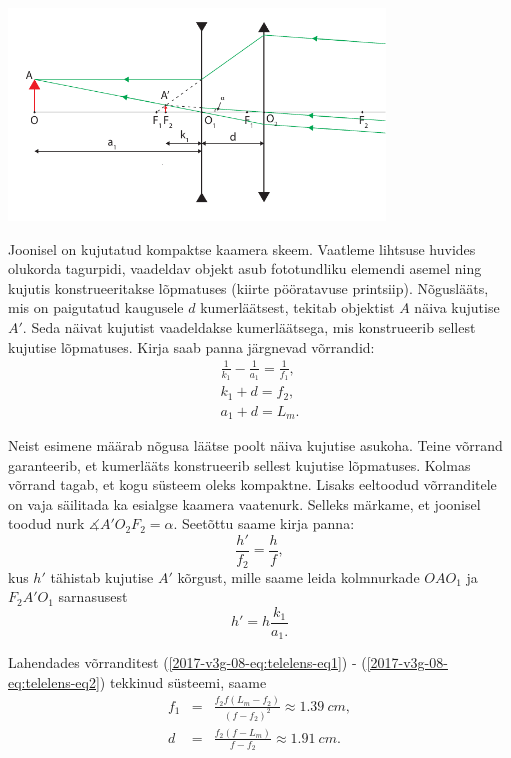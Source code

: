 \documentclass[11pt, twoside]{article}
\begin{document}
{{\begin{center}
	\includegraphics[width=10cm]{2017-v3g-08-skeem__telephoto.pdf}
\end{center}
Joonisel on kujutatud kompaktse kaamera skeem. Vaatleme lihtsuse huvides
olukorda tagurpidi, vaadeldav objekt asub fototundliku elemendi asemel
ning kujutis konstrueeritakse lõpmatuses (kiirte pööratavuse printsiip).
Nõguslääts, mis on paigutatud kaugusele $d$ kumerläätsest, tekitab
objektist $A$ näiva kujutise $A'$. Seda näivat kujutist vaadeldakse
kumerläätsega, mis konstrueerib sellest kujutise lõpmatuses. Kirja
saab panna järgnevad võrrandid:
\begin{eqnarray}
\frac{1}{k_{1}}-\frac{1}{a_{1}} = \frac{1}{f_{1}}, \label{2017-v3g-08-eq:telelens-eq1}\\
k_{1}+d = f_{2},\\
a_{1}+d = L_{m}.
\end{eqnarray}

\noindent Neist esimene määrab nõgusa läätse poolt näiva kujutise asukoha.
Teine võrrand garanteerib, et kumerlääts konstrueerib sellest kujutise
lõpmatuses. Kolmas võrrand tagab, et kogu süsteem oleks kompaktne.
Lisaks eeltoodud võrranditele on vaja säilitada ka esialgse kaamera
vaatenurk. Selleks märkame, et joonisel toodud nurk $\measuredangle A'O_{2}F_{2}=\alpha.$
Seetõttu saame kirja panna:
\begin{equation}
\frac{h'}{f_{2}}=\frac{h}{f},
\end{equation}
\noindent kus $h'$ tähistab kujutise $A'$ kõrgust, mille saame leida
kolmnurkade $OAO_{1}$ ja $F_{2}A'O_{1}$ sarnasusest
\begin{equation}
h'=h\frac{k_{1}}{a_{1}.}\label{2017-v3g-08-eq:telelens-eq2}
\end{equation}

Lahendades võrranditest (\ref{2017-v3g-08-eq:telelens-eq1}) - (\ref{2017-v3g-08-eq:telelens-eq2})
tekkinud süsteemi, saame
\begin{eqnarray*}
f_{1} & = & \frac{f_{2}f(L_{m}-f_{2})}{\left(f-f_{2}\right)^{2}}\approx\SI{1.39}{cm},\\
d & = & \frac{f_{2}(f-L_{m})}{f-f_{2}}\approx\SI{1.91}{cm}.
\end{eqnarray*}
\fi
}

}
\end{document}
